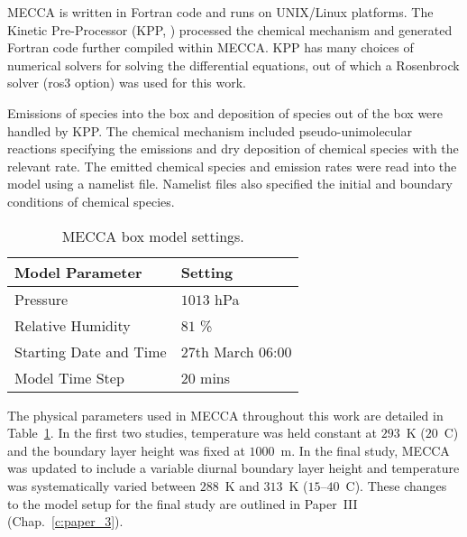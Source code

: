 MECCA is written in Fortran code and runs on UNIX/Linux platforms.
The Kinetic Pre-Processor (KPP, \citet{Damian:2002}) processed the chemical mechanism and generated Fortran code further compiled within MECCA.
KPP has many choices of numerical solvers for solving the differential equations, out of which a Rosenbrock solver (ros3 option) was used for this work.

Emissions of species into the box and deposition of species out of the box were handled by KPP.
The chemical mechanism included pseudo-unimolecular reactions specifying the emissions and dry deposition of chemical species with the relevant rate.
The emitted chemical species and emission rates were read into the model using a namelist file.  
Namelist files also specified the initial and boundary conditions of chemical species.

{%
    \renewcommand{\arraystretch}{1.1}%
    \begin{table}[t]%
        \begin{center}%
            \caption{MECCA box model settings.}%
            \vspace{3mm}
            \begin{tabular}{ll}%
                \hline \hline
                \textbf{Model Parameter} & \textbf{Setting} \\
                \hline \hline
                Pressure & $1013$ hPa \\
                Relative Humidity & $81$ \% \\
                Starting Date and Time & 27th March 06:00 \\
                Model Time Step & $20$ mins \\
                \hline \hline
            \end{tabular}%
            \label{t:model_setup}%
        \end{center}%
    \end{table}%
}

The physical parameters used in MECCA throughout this work are detailed in Table~\ref{t:model_setup}.
In the first two studies, temperature was held constant at $293$~K ($20$~\degree C) and the boundary layer height was fixed at $1000$~m.
In the final study, MECCA was updated to include a variable diurnal boundary layer height and temperature was systematically varied between $288$~K and $313$~K ($15$--$40$~\degree C).
These changes to the model setup for the final study are outlined in Paper~III (Chap.~\ref{c:paper_3}).

